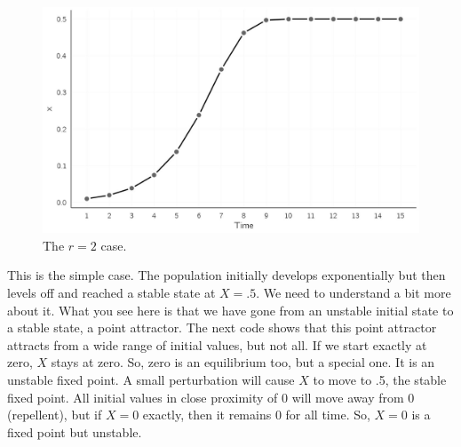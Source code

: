 \documentclass[
  a4paper,
  DIV=11,
  numbers=noendperiod]{scrreprt}
\begin{document}
\begin{figure}

{\centering \includegraphics{media/ch2/fig-ch2-img2.jpg}

}

\caption{\label{fig-ch2-img2}The \(r=2\) case.}

\end{figure}

This is the simple case. The population initially develops exponentially
but then levels off and reached a stable state at \(X = .5\). We need to
understand a bit more about it. What you see here is that we have gone
from an unstable initial state to a stable state, a point attractor. The
next code shows that this point attractor attracts from a wide range of
initial values, but not all. If we start exactly at zero, \(X\) stays at
zero. So, zero is an equilibrium too, but a special one. It is an
unstable fixed point. A small perturbation will cause \(X\) to move to
.5, the stable fixed point. All initial values in close proximity of 0
will move away from 0 (repellent), but if \(X = 0\) exactly, then it
remains 0 for all time. So, \(X = 0\) is a fixed point but unstable.
\end{document}
